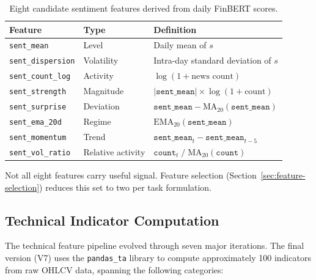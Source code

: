 \begin{table}[htbp]
\centering
\caption{Eight candidate sentiment features derived from daily FinBERT scores.}
\label{tab:sentiment-features}
\begin{tabular}{@{}llp{6.5cm}@{}}
\toprule
\textbf{Feature}          & \textbf{Type}     & \textbf{Definition} \\
\midrule
\texttt{sent\_mean}       & Level             & Daily mean of $s$ \\
\texttt{sent\_dispersion} & Volatility        & Intra-day standard deviation of $s$ \\
\texttt{sent\_count\_log} & Activity          & $\log(1 + \text{news count})$ \\
\texttt{sent\_strength}   & Magnitude         & $|\texttt{sent\_mean}| \times \log(1+\text{count})$ \\
\texttt{sent\_surprise}   & Deviation         & $\texttt{sent\_mean} - \text{MA}_{20}(\texttt{sent\_mean})$ \\
\texttt{sent\_ema\_20d}   & Regime            & $\text{EMA}_{20}(\texttt{sent\_mean})$ \\
\texttt{sent\_momentum}   & Trend             & $\texttt{sent\_mean}_t - \texttt{sent\_mean}_{t-5}$ \\
\texttt{sent\_vol\_ratio} & Relative activity & $\texttt{count}_t\; /\; \text{MA}_{20}(\texttt{count})$ \\
\bottomrule
\end{tabular}
\end{table}

Not all eight features carry useful signal.  Feature selection
(Section~\ref{sec:feature-selection}) reduces this set to two per task
formulation.

\subsection{Technical Indicator Computation}
\label{sec:technical-indicators}

The technical feature pipeline evolved through seven major iterations.  The
final version (V7) uses the \texttt{pandas\_ta} library to compute approximately
100 indicators from raw OHLCV data, spanning the following categories:

